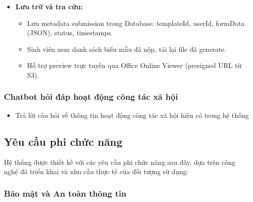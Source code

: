 \begin{itemize}
    \item \textbf{Lưu trữ và tra cứu:}
    \begin{itemize}
        \item Lưu metadata submission trong Database: templateId, userId, formData (JSON), status, timestamps.
        \item Sinh viên xem danh sách biểu mẫu đã nộp, tải lại file đã generate.
        \item Hỗ trợ preview trực tuyến qua Office Online Viewer (presigned URL từ S3).
    \end{itemize}
\end{itemize}

\subsubsection{Chatbot hỏi đáp hoạt động công tác xã hội}

\begin{itemize}
    \item Trả lời câu hỏi về thông tin hoạt động công tác xã hội hiện có trong hệ thống
\end{itemize}

\subsection{Yêu cầu phi chức năng}

Hệ thống được thiết kế với các yêu cầu phi chức năng sau đây, dựa trên công nghệ đã triển khai và nhu cầu thực tế của đối tượng sử dụng:

\subsubsection{Bảo mật và An toàn thông tin}

